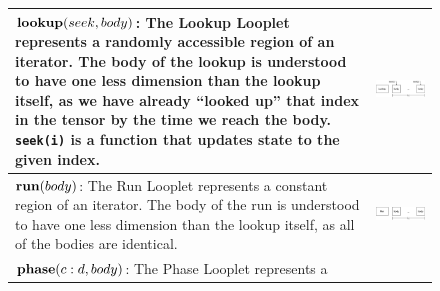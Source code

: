 \begin{figure}[ht]
\begingroup
\footnotesize
\setlength{\tabcolsep}{10pt} 
\renewcommand{\arraystretch}{1.5}
\begin{tabular} {|l|c|} 
\hline
    \begin{minipage}[c]{0.65\linewidth}
        $\text{\textbf{lookup}}(seek, body)$: The Lookup Looplet represents a
        randomly accessible region of an iterator. The body of the lookup is
        understood to have one less dimension than the lookup itself, as we have
        already ``looked up'' that index in the tensor by the time we reach the
        body. \texttt{seek(i)} is a function that updates state to the given
        index.
    \end{minipage} &
    \begin{minipage}[c]{0.25\linewidth}
        \centering
        \includegraphics[scale=0.20]{Looplets-lookup.png}
    \end{minipage} \\ \hline
    \begin{minipage}[c]{0.65\linewidth}
        $\text{\textbf{run}}(body)$: The Run Looplet represents a constant
        region of an iterator. The body of the run is understood to have one
        less dimension than the lookup itself, as all of the bodies are
        identical.
    \end{minipage} &
    \begin{minipage}[c]{0.25\linewidth}
        \centering
        \includegraphics[scale=0.20]{Looplets-run.png}
    \end{minipage} \\ \hline
    \begin{minipage}[c]{0.65\linewidth}
        $\text{\textbf{phase}}(c:d, body)$: The Phase Looplet represents a

\end{minipage}
\end{tabular}
\end{figure}
